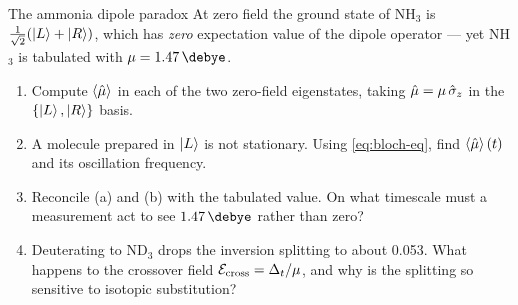 \begin{problem}{The ammonia dipole paradox}
\label{prob:nh3}
At zero field the ground state of NH$_3$ is $\tfrac{1}{\sqrt2}(\ket{L}+\ket{R})$, which
has \emph{zero} expectation value of the dipole operator --- yet NH$_3$ is tabulated with
$\mu = \SI{1.47}{\debye}$.
\begin{enumerate}[label=(\alph*),leftmargin=*,itemsep=1pt]
\item Compute $\Braket{\hat\mu}$ in each of the two zero-field eigenstates, taking
$\hat\mu = \mu\,\hat{\sigma}_z$ in the $\{\ket{L},\ket{R}\}$ basis.
\item A molecule prepared in $\ket{L}$ is not stationary. Using \cref{eq:bloch-eq}, find
$\Braket{\hat\mu}(t)$ and its oscillation frequency.
\item Reconcile (a) and (b) with the tabulated value. On what timescale must a
measurement act to see $\SI{1.47}{\debye}$ rather than zero?
\item Deuterating to ND$_3$ drops the inversion splitting to about
\SI{0.053}{\wavenumber}. What happens to the crossover field
$\mathcal{E}_{\rm cross}=\Delta_t/\mu$, and why is the splitting so sensitive to
isotopic substitution?
\end{enumerate}
\end{problem}

